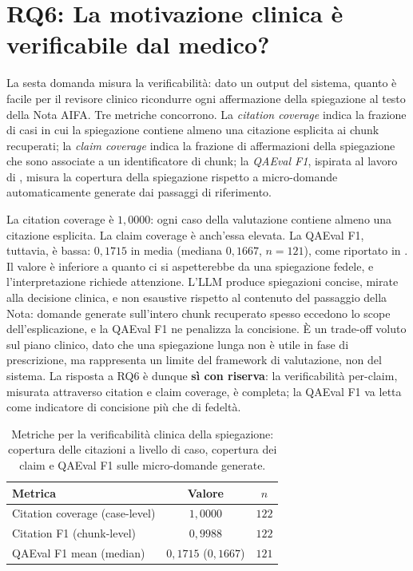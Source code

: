 \section{RQ6: La motivazione clinica è verificabile dal medico?}
\label{sec:rq6}

La sesta domanda misura la verificabilità: dato un output del sistema, quanto è facile per il revisore clinico ricondurre ogni affermazione della spiegazione al testo della Nota AIFA. Tre metriche concorrono. La \emph{citation coverage} indica la frazione di casi in cui la spiegazione contiene almeno una citazione esplicita ai chunk recuperati; la \emph{claim coverage} indica la frazione di affermazioni della spiegazione che sono associate a un identificatore di chunk; la \emph{QAEval F1}, ispirata al lavoro di \citet{deutsch2021qaeval}, misura la copertura della spiegazione rispetto a micro-domande automaticamente generate dai passaggi di riferimento.

La citation coverage è $1{,}0000$: ogni caso della valutazione contiene almeno una citazione esplicita. La claim coverage è anch'essa elevata. La QAEval F1, tuttavia, è bassa: $0{,}1715$ in media (mediana $0{,}1667$, $n=121$), come riportato in . Il valore è inferiore a quanto ci si aspetterebbe da una spiegazione fedele, e l'interpretazione richiede attenzione. L'LLM produce spiegazioni concise, mirate alla decisione clinica, e non esaustive rispetto al contenuto del passaggio della Nota: domande generate sull'intero chunk recuperato spesso eccedono lo scope dell'esplicazione, e la QAEval F1 ne penalizza la concisione. È un trade-off voluto sul piano clinico, dato che una spiegazione lunga non è utile in fase di prescrizione, ma rappresenta un limite del framework di valutazione, non del sistema. La risposta a RQ6 è dunque \textbf{sì con riserva}: la verificabilità per-claim, misurata attraverso citation e claim coverage, è completa; la QAEval F1 va letta come indicatore di concisione più che di fedeltà.

\begin{table}[t]
  \centering
  \caption{Metriche per la verificabilità clinica della spiegazione: copertura delle citazioni a livello di caso, copertura dei claim e QAEval F1 sulle micro-domande generate.}
  \label{tab:rq6}
  \small
  \begin{tabular}{lcc}
    \toprule
    Metrica & Valore & $n$ \\
    \midrule
    Citation coverage (case-level) & $1{,}0000$ & $122$ \\
    Citation F1 (chunk-level)      & $0{,}9988$ & $122$ \\
    QAEval F1 mean (median)        & $0{,}1715$ ($0{,}1667$) & $121$ \\
    \bottomrule
  \end{tabular}
\end{table}

